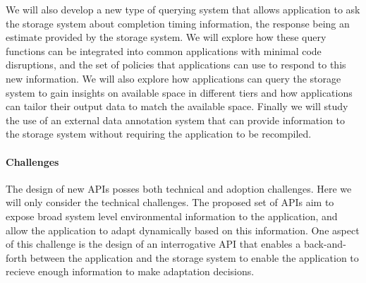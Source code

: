 We will also develop a new type of querying system that allows application
to ask the storage system about completion timing information, the response
being an estimate provided by the storage system. We will explore how these
query functions can be integrated into common applications with minimal code
disruptions, and the set of policies that applications can use to respond to
this new information. We will also explore how applications can query the
storage system to gain insights on available space in different tiers and
how applications can tailor their output data to match the available space. 
Finally we will study the use of an external data annotation system that can
provide information to the storage system without requiring the application
to be recompiled. 

\paragraph{Challenges}
The design of new APIs posses both technical and adoption challenges. Here
we will only consider the technical challenges. The proposed set of APIs aim
to expose broad system level environmental information to the application,
and allow the application to adapt dynamically based on this information.
One aspect of this challenge is the design of an interrogative API that
enables a back-and-forth between the application and the storage system to
enable the application to recieve enough information to make adaptation
decisions. 

